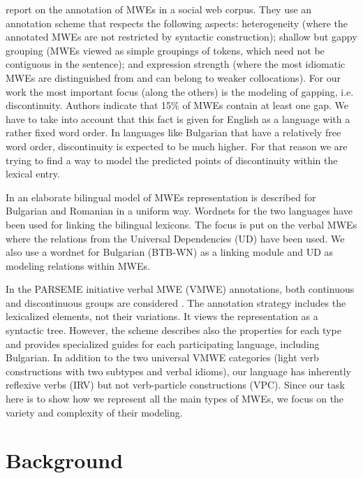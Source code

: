 \documentclass[output=paper,colorlinks,citecolor=brown]{langscibook}
\begin{document}
\citet{schneider-etal-2014-comprehensive} report on the annotation of MWEs in a social web corpus. They use an annotation scheme that respects the following aspects: heterogeneity (where the annotated MWEs are not restricted by
syntactic construction); shallow but gappy grouping (MWEs viewed as simple groupings of tokens, which need not be contiguous in the sentence); and expression strength (where the most idiomatic MWEs are distinguished from and can belong to weaker collocations). For our work the most important focus (along the others) is the modeling of gapping, i.e. discontinuity. Authors indicate that 15\% of MWEs contain at least one gap. We have to take into account that this fact is given for English as a language with a rather fixed word order. In languages like Bulgarian that have a relatively free word order, discontinuity is expected to be much higher. For that reason we are trying to find a way to model the predicted points of discontinuity within the lexical entry.

In  an elaborate bilingual model of MWEs representation is described for Bulgarian and Romanian in a uniform way. Wordnets for the two languages have been used for linking the bilingual lexicons. The focus is put on the verbal MWEs where the relations from the Universal Dependencies (UD) have been used. We also use a wordnet for Bulgarian (BTB-WN) as a linking module and UD as modeling relations within MWEs.

In the PARSEME initiative verbal MWE (VMWE) annotations, both continuous and discontinuous groups are considered \citep{savary:hal-01917174}. The annotation strategy includes the lexicalized elements, not their variations. It views the representation as a syntactic tree. However, the scheme describes also the properties for each type and provides specialized guides for each participating language, including Bulgarian. In addition to the two universal VMWE categories (light verb constructions with two subtypes and verbal idioms), our language has inherently reflexive verbs (IRV) but not verb-particle constructions (VPC). Since our task here is to show how we represent all the main types of MWEs, we focus on the variety and complexity of their modeling. 

\section{Background}
\label{BackgroundOS}
\end{document}
